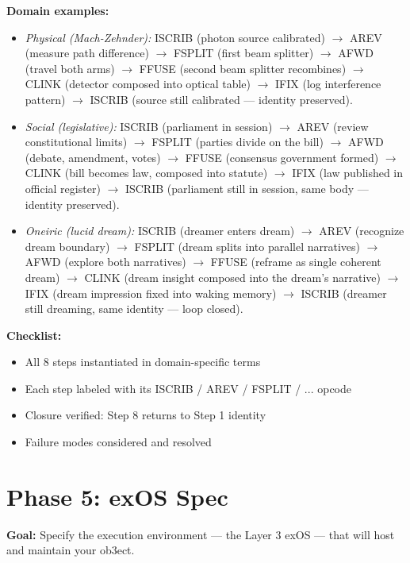 \documentclass[12pt,a4paper]{article}
\begin{document}
{\bf Domain examples:}
\begin{itemize}
\item {\it Physical (Mach-Zehnder):} ISCRIB (photon source calibrated) $\to$ AREV
    (measure path difference) $\to$ FSPLIT (first beam splitter) $\to$ AFWD (travel
    both arms) $\to$ FFUSE (second beam splitter recombines) $\to$ CLINK (detector
    composed into optical table) $\to$ IFIX (log interference pattern) $\to$ ISCRIB
    (source still calibrated — identity preserved).

\item {\it Social (legislative):} ISCRIB (parliament in session) $\to$ AREV (review
    constitutional limits) $\to$ FSPLIT (parties divide on the bill) $\to$ AFWD
    (debate, amendment, votes) $\to$ FFUSE (consensus government formed) $\to$
    CLINK (bill becomes law, composed into statute) $\to$ IFIX (law published in
    official register) $\to$ ISCRIB (parliament still in session, same body — identity
    preserved).

\item {\it Oneiric (lucid dream):} ISCRIB (dreamer enters dream) $\to$ AREV (recognize
    dream boundary) $\to$ FSPLIT (dream splits into parallel narratives) $\to$ AFWD
    (explore both narratives) $\to$ FFUSE (reframe as single coherent dream) $\to$
    CLINK (dream insight composed into the dream's narrative) $\to$ IFIX (dream
    impression fixed into waking memory) $\to$ ISCRIB (dreamer still dreaming, same
    identity — loop closed).
\end{itemize}

{\bf Checklist:}
\begin{itemize}
\item[ ] All 8 steps instantiated in domain-specific terms
\item[ ] Each step labeled with its ISCRIB / AREV / FSPLIT / ... opcode
\item[ ] Closure verified: Step 8 returns to Step 1 identity
\item[ ] Failure modes considered and resolved
\end{itemize}

\section{Phase 5: exOS Spec}

{\bf Goal:} Specify the execution environment — the Layer 3 exOS — that will host
and maintain your ob3ect.
\end{document}
